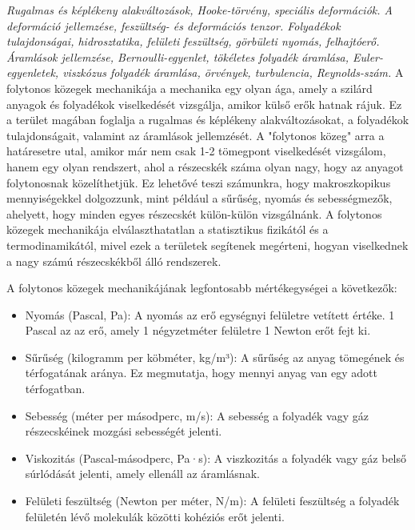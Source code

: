 \documentclass[../main.tex]{subfiles}
\begin{document}
\textit{Rugalmas és képlékeny alakváltozások, Hooke-törvény, speciális deformációk. A deformáció jellemzése, feszültség- és deformációs tenzor.
Folyadékok tulajdonságai, hidrosztatika, felületi feszültség, görbületi nyomás, felhajtóerő. Áramlások jellemzése, Bernoulli-egyenlet,
tökéletes folyadék áramlása, Euler-egyenletek, viszkózus folyadék áramlása, örvények, turbulencia, Reynolds-szám.}
\newline
\newline
A folytonos közegek mechanikája a mechanika egy olyan ága, amely a szilárd anyagok és folyadékok viselkedését vizsgálja,
amikor külső erők hatnak rájuk. Ez a terület magában foglalja a rugalmas és képlékeny alakváltozásokat,
a folyadékok tulajdonságait, valamint az áramlások jellemzését. A "folytonos közeg" arra a határesetre utal,
amikor már nem csak 1-2 tömegpont viselkedését vizsgálom, hanem egy olyan rendszert, ahol a részecskék száma olyan nagy,
hogy az anyagot folytonosnak közelíthetjük. Ez lehetővé teszi számunkra, hogy makroszkopikus mennyiségekkel dolgozzunk,
mint például a sűrűség, nyomás és sebességmezők, ahelyett, hogy minden egyes részecskét külön-külön vizsgálnánk. A folytonos közegek mechanikája
elválaszthatatlan a statisztikus fizikától és a termodinamikától, mivel ezek a területek segítenek megérteni, hogyan viselkednek a nagy számú részecskékből álló rendszerek.

A folytonos közegek mechanikájának legfontosabb mértékegységei a következők:
\begin{itemize}
    \item Nyomás (Pascal, Pa): A nyomás az erő egységnyi felületre vetített értéke. 1 Pascal az az erő, amely 1 négyzetméter felületre 1 Newton erőt fejt ki.
    \item Sűrűség (kilogramm per köbméter, kg/m³): A sűrűség az anyag tömegének és térfogatának aránya. Ez megmutatja, hogy mennyi anyag van egy adott térfogatban.
    \item Sebesség (méter per másodperc, m/s): A sebesség a folyadék vagy gáz részecskéinek mozgási sebességét jelenti.
    \item Viskozitás (Pascal-másodperc, Pa·s): A viszkozitás a folyadék vagy gáz belső súrlódását jelenti, amely ellenáll az áramlásnak.
    \item Felületi feszültség (Newton per méter, N/m): A felületi feszültség a folyadék felületén lévő molekulák közötti kohéziós erőt jelenti.
\end{itemize}
\end{document}
